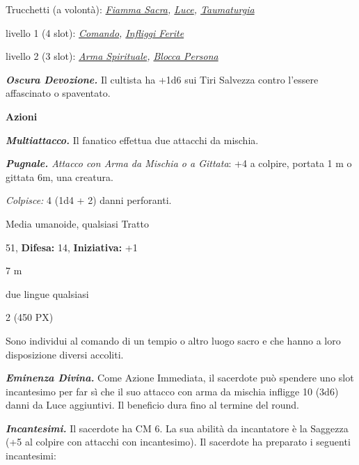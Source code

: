 \begin{multicols}{2}
{Trucchetti (a volontà): \emph{\hyperlink{Fiamma Sacra}{Fiamma Sacra}, \hyperlink{Luce}{Luce}, \hyperlink{Taumaturgia}{Taumaturgia}}

livello 1 (4 slot): \emph{\hyperlink{Comando}{Comando}, \hyperlink{Infliggi Ferite}{Infliggi Ferite}}

livello 2 (3 slot): \emph{\hyperlink{Arma Spirituale}{Arma Spirituale}, \hyperlink{Blocca Persona}{Blocca Persona}}

\emph{\textbf{Oscura Devozione.}} Il cultista ha +1d6 sui Tiri Salvezza contro l'essere affascinato o spaventato.

\textbf{Azioni}

\emph{\textbf{Multiattacco.}} Il fanatico effettua due attacchi da mischia.

\emph{\textbf{Pugnale.} Attacco con Arma da Mischia o a Gittata}: +4 a colpire, portata 1 m o gittata 6m, una creatura.

\emph{Colpisce:} 4 (1d4 + 2) danni perforanti.

\begin{description}[noitemsep, topsep=0pt, parsep=0pt, partopsep=0pt, leftmargin=0cm, labelwidth=2.2cm]
    \item[\textbf{Taglia/Tipo:}] Media umanoide, qualsiasi Tratto
    \item[\textbf{Caratt.:}] 
    \item[\textbf{Punti Ferita:}] 51,  \textbf{Difesa:} 14,  \textbf{Iniziativa:} +1
    \item[\textbf{Tiri Salvez.:}] 
    \item[\textbf{Movimento:}] 7 m
    \item[\textbf{Linguaggi:}] due lingue qualsiasi
    \item[\textbf{Sfida:}] 2 (450 PX)\smallskip
\end{description}

Sono individui al comando di un tempio o altro luogo sacro e che hanno a loro disposizione diversi accoliti.

\emph{\textbf{Eminenza Divina.}} Come Azione Immediata, il sacerdote può spendere uno slot incantesimo per far sì che il suo attacco con arma da mischia infligge 10 (3d6) danni da Luce aggiuntivi. Il beneficio dura fino al termine del round.

\emph{\textbf{Incantesimi.}} Il sacerdote ha CM 6. La sua abilità da incantatore è la Saggezza (+5 al colpire con attacchi con incantesimo). Il sacerdote ha preparato i seguenti incantesimi:

}
\end{multicols}
